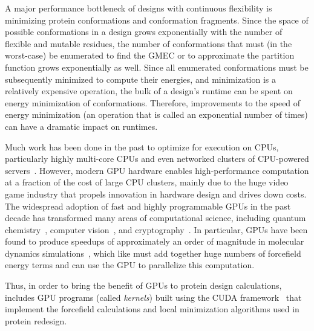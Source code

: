 A major performance bottleneck of \osprey designs with continuous flexibility is minimizing protein conformations and conformation fragments. Since the space of possible conformations in a design grows exponentially with the number of flexible and mutable residues, the number of conformations that must (in the worst-case) be enumerated to find the GMEC or to approximate the partition function grows exponentially as well. Since all enumerated conformations must be subsequently minimized to compute their energies, and minimization is a relatively expensive operation, the bulk of a design's runtime can be spent on energy minimization of conformations. Therefore, improvements to the speed of energy minimization (an operation that is called an exponential number of times) can have a dramatic impact on \osprey runtimes.

Much work has been done in the past to optimize \osprey for execution on CPUs, particularly highly multi-core CPUs and even networked clusters of CPU-powered servers~\cite{minBounds_DACS,cloud_OSPREY}. However, modern GPU hardware enables high-performance computation at a fraction of the cost of large CPU clusters, mainly due to the huge video game industry that propels innovation in hardware design and drives down costs. The widespread adoption of fast and highly programmable GPUs in the past decade has transformed many areas of computational science, including quantum chemistry~\cite{GPU_QM}, computer vision~\cite{ResNet}, and cryptography~\cite{GPU_crypto}.  In particular, GPUs have been found to produce speedups of approximately an order of magnitude in molecular dynamics simulations~\cite{HOOMD_GPU,AMBER_GPU_microseconds}, which like \osprey must add together huge numbers of forcefield energy terms and can use the GPU to parallelize this computation.  

Thus, in order to bring the benefit of GPUs to protein design calculations,  includes GPU programs (called {\it kernels}) built using the CUDA framework~\cite{nvidia2010programming} that implement the forcefield calculations and local minimization algorithms used in protein redesign.


